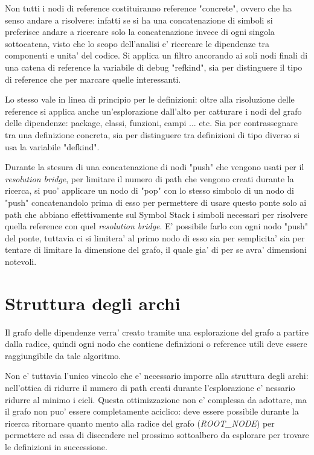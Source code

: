 \par
Non tutti i nodi di reference costituiranno reference "concrete", ovvero che ha senso andare a risolvere: infatti se si ha una concatenazione di simboli si preferisce andare a ricercare solo la concatenazione invece di ogni singola sottocatena, visto che lo scopo dell'analisi e' ricercare le dipendenze tra componenti e unita' del codice. Si applica un filtro ancorando ai soli nodi finali di una catena di reference la variabile di debug "refkind", sia per distinguere il tipo di reference che per marcare quelle interessanti.

\par
Lo stesso vale in linea di principio per le definizioni: oltre alla risoluzione delle reference si applica anche un'esplorazione dall'alto per catturare i nodi del grafo delle dipendenze: package, classi, funzioni, campi ... etc. Sia per contrassegnare tra una definizione concreta, sia per distinguere tra definizioni di tipo diverso si usa la variabile "defkind".

\par
Durante la stesura di una concatenazione di nodi "push" che vengono usati per il \emph{resolution bridge}, per limitare il numero di path che vengono creati durante la ricerca, si puo' applicare un nodo di "pop" con lo stesso simbolo di un nodo di "push" concatenandolo prima di esso per permettere di usare questo ponte solo ai path che abbiano effettivamente sul Symbol Stack i simboli necessari per risolvere quella reference con quel \emph{resolution bridge}.
E' possibile farlo con ogni nodo "push" del ponte, tuttavia ci si limitera' al primo nodo di esso sia per semplicita' sia per tentare di limitare la dimensione del grafo, il quale gia' di per se avra' dimensioni notevoli.

\section{Struttura degli archi}

Il grafo delle dipendenze verra' creato tramite una esplorazione del grafo a partire dalla radice, quindi ogni nodo che contiene definizioni o reference utili deve essere raggiungibile da tale algoritmo.

\par
Non e' tuttavia l'unico vincolo che e' necessario imporre alla struttura degli archi: nell'ottica di ridurre il numero di path creati durante l'esplorazione e' nessario ridurre al minimo i cicli.
Questa ottimizzazione non e' complessa da adottare, ma il grafo non puo' essere completamente aciclico: deve essere possibile durante la ricerca ritornare quanto mento alla radice del grafo (\emph{ROOT\_NODE}) per permettere ad essa di discendere nel prossimo sottoalbero da esplorare per trovare le definizioni in successione.

